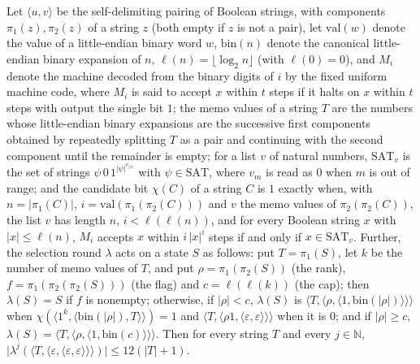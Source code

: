 \begin{theorem}
\label{Complexity.ladner_select_size}
\leanok
{}
Let $\langle u,v\rangle$ be the self-delimiting pairing of Boolean strings, with components $\pi_1(z),\pi_2(z)$ of a string $z$ (both empty if $z$ is not a pair), let $\mathrm{val}(w)$ denote the value of a little-endian binary word $w$, $\mathrm{bin}(n)$ denote the canonical little-endian binary expansion of $n$, $\ell(n)=\lfloor\log_2 n\rfloor$ (with $\ell(0)=0$), and $M_i$ denote the machine decoded from the binary digits of $i$ by the fixed uniform machine code, where $M_i$ is said to accept $x$ within $t$ steps if it halts on $x$ within $t$ steps with output the single bit $1$; the memo values of a string $T$ are the numbers whose little-endian binary expansions are the successive first components obtained by repeatedly splitting $T$ as a pair and continuing with the second component until the remainder is empty; for a list $v$ of natural numbers, $\mathrm{SAT}_v$ is the set of strings $\psi\,0\,1^{|\psi|^{v_{|\psi|}}}$ with $\psi\in\mathrm{SAT}$, where $v_m$ is read as $0$ when $m$ is out of range; and the candidate bit $\chi(C)$ of a string $C$ is $1$ exactly when, with $n=|\pi_1(C)|$, $i=\mathrm{val}(\pi_1(\pi_2(C)))$ and $v$ the memo values of $\pi_2(\pi_2(C))$, the list $v$ has length $n$, $i<\ell(\ell(n))$, and for every Boolean string $x$ with $|x|\le\ell(n)$, $M_i$ accepts $x$ within $i\,|x|^i$ steps if and only if $x\in\mathrm{SAT}_v$. Further, the selection round $\lambda$ acts on a state $S$ as follows: put $T=\pi_1(S)$, let $k$ be the number of memo values of $T$, and put $\rho=\pi_1(\pi_2(S))$ (the rank), $f=\pi_1(\pi_2(\pi_2(S)))$ (the flag) and $c=\ell(\ell(k))$ (the cap); then $\lambda(S)=S$ if $f$ is nonempty; otherwise, if $|\rho|<c$, $\lambda(S)$ is $\langle T,\langle\rho,\langle 1,\mathrm{bin}(|\rho|)\rangle\rangle\rangle$ when $\chi(\langle 1^{k},\langle\mathrm{bin}(|\rho|),T\rangle\rangle)=1$ and $\langle T,\langle\rho1,\langle\varepsilon,\varepsilon\rangle\rangle\rangle$ when it is $0$; and if $|\rho|\ge c$, $\lambda(S)=\langle T,\langle\rho,\langle 1,\mathrm{bin}(c)\rangle\rangle\rangle$. Then for
every string $T$ and every $j\in\mathbb N$,
$\bigl|\lambda^{j}(\langle T,\langle\varepsilon,\langle\varepsilon,\varepsilon\rangle\rangle\rangle)\bigr|
\le 12(|T|+1)$.
\end{theorem}

